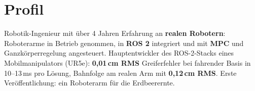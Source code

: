 \section{Profil}
Robotik-Ingenieur mit über 4 Jahren Erfahrung an \textbf{realen Robotern}: Roboterarme in Betrieb genommen, in \textbf{ROS 2} integriert und mit \textbf{MPC} und Ganzkörperregelung angesteuert. Hauptentwickler des ROS-2-Stacks eines Mobilmanipulators (UR5e): \textbf{0,01\,cm RMS} Greiferfehler bei fahrender Basis in 10--13\,ms pro Lösung, Bahnfolge am realen Arm mit \textbf{0,12\,cm RMS}. Erste Veröffentlichung: ein Roboterarm für die Erdbeerernte.
